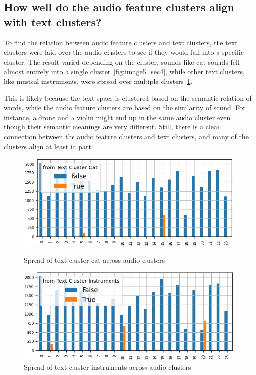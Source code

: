 \subsection{How well do the audio feature clusters align with text clusters?}
\label{sec:Text Features:c}


To find the relation between audio feature clusters and text clusters, the text clusters were laid over the audio clusters to see if they would fall into a specific cluster. The result varied depending on the cluster, sounds like cat sounds fell almost entirely into a single cluster~\ref{fig:image5_sec4}, while other text clusters, like musical instruments, were spread over multiple clusters~\ref{fig:image6_sec4}.

This is likely because the text space is clustered based on the semantic relation of words, while the audio feature clusters are based on the similarity of sound. For instance, a drone and a violin might end up in the same audio cluster even though their semantic meanings are very different. 
Still, there is a clear connection between the audio feature clusters and text clusters, and many of the clusters align at least in part.

\begin{figure}[h]
  \centering
  \begin{minipage}[b]{0.49\textwidth}
    \centering
    \includegraphics[width=\textwidth]{figs/cat_test_cluster_over_audio_cluster.jpg}
    \caption{Spread of text cluster cat across audio clusters}
    \label{fig:image5_sec4}
  \end{minipage}
  \hfill
  \begin{minipage}[b]{0.49\textwidth}
    \centering
    \includegraphics[width=\textwidth]{figs/instruments_test_cluster_over_audio_cluster.jpg}
    \caption{Spread of text cluster instruments across audio clusters}
    \label{fig:image6_sec4}
  \end{minipage}
\end{figure}



